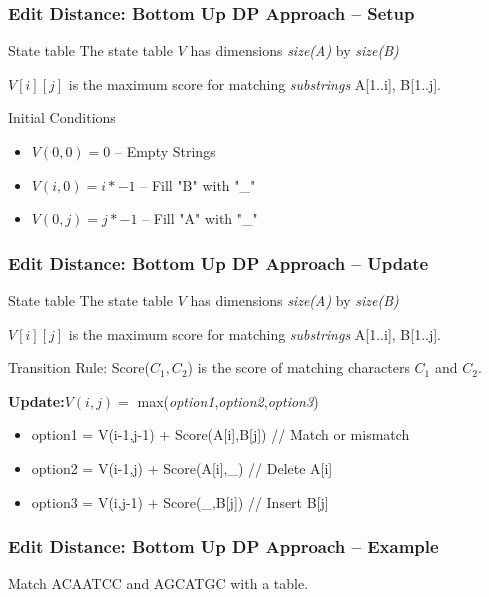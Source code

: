 \documentclass{beamer}
\begin{document}
\begin{frame}
  \frametitle{Edit Distance: Bottom Up DP Approach -- Setup}
  \begin{block}{State table}
    The state table $V$ has dimensions \emph{size(A)} by \emph{size(B)}
    \smallskip

    $V[i][j]$ is the maximum score for matching \emph{substrings} A[1..i], B[1..j].
  \end{block}
  \begin{exampleblock}{Initial Conditions}
    \begin{itemize}
    \item $V(0,0) = 0$ -- Empty Strings
    \item $V(i,0) = i*-1$ -- Fill "B" with "\_"
    \item $V(0,j) = j*-1$ -- Fill "A" with "\_"
    \end{itemize}
  \end{exampleblock}
\end{frame}

\begin{frame}
  \frametitle{Edit Distance: Bottom Up DP Approach -- Update}
  \begin{block}{State table}
    The state table $V$ has dimensions \emph{size(A)} by \emph{size(B)}
    \smallskip

    $V[i][j]$ is the maximum score for matching \emph{substrings} A[1..i], B[1..j].
  \end{block}
  \begin{exampleblock}{Transition Rule:}
    Score($C_1,C_2$) is the score of matching characters $C_1$ and $C_2$.\bigskip


    {\bf Update:}$V(i,j) = $ max(\emph{option1},\emph{option2},\emph{option3})
    \begin{itemize}
    \item option1 = V(i-1,j-1) + Score(A[i],B[j]) // Match or mismatch
    \item option2 = V(i-1,j) + Score(A[i],\_) // Delete A[i]
    \item option3 = V(i,j-1) + Score(\_,B[j]) // Insert B[j]
    \end{itemize}
  \end{exampleblock}
\end{frame}

\begin{frame}
  \frametitle{Edit Distance: Bottom Up DP Approach -- Example}
  Match ACAATCC and AGCATGC with a table.

\end{frame}
\end{document}

